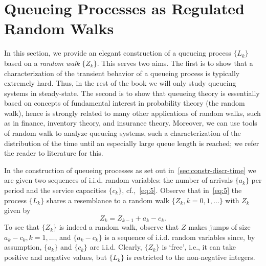 \section{Queueing Processes as Regulated Random Walks}
\label{sec:queu-proc-as}


In this section, we provide an elegant construction of a queueing process $\{L_k\}$ based on a \emph{random walk} $\{Z_k\}$.
This serves two aims.
The first is to show that a characterization of the transient behavior of a queueing process is typically extremely hard.
Thus, in the rest of the book we will only study queueing systems in steady-state.
The second is to show that queueing theory is essentially based on concepts of fundamental interest in probability theory (the random walk), hence is strongly related to many other applications of random walks, such as in finance, inventory theory, and insurance theory.
Moreover, we can use tools of random walk to analyze queueing systems, such a characterization of the distribution of the time until an especially large queue length is reached; we refer the reader to literature for this.







In the construction of queueing processes as set out in~\cref{sec:constr-discr-time} we are given two sequences of i.i.d.
random variables: the number of arrivals $\{a_k\}$ per period and the service capacities $\{c_k\}$, cf.,~\cref{eq:5}.
Observe that in~\cref{eq:5} the process $\{L_k\}$ shares a resemblance to a random walk $\{Z_k, k=0,1,\ldots\}$ with $Z_k$ given by
\begin{equation}\label{eq:44}
 Z_k = Z_{k-1} + a_k - c_k.
\end{equation}
To see that $\{Z_k\}$ is indeed a random walk, observe that $Z$ makes jumps of size $a_k-c_k, k=1,\ldots$, and $\{a_k-c_k\}$ is a sequence of i.i.d.
random variables since, by assumption, $\{a_k\}$ and $\{c_k\}$ are i.i.d.
Clearly, $\{Z_k\}$ is `free', i.e., it can take positive and negative values, but $\{L_k\}$ is restricted to the non-negative integers.

